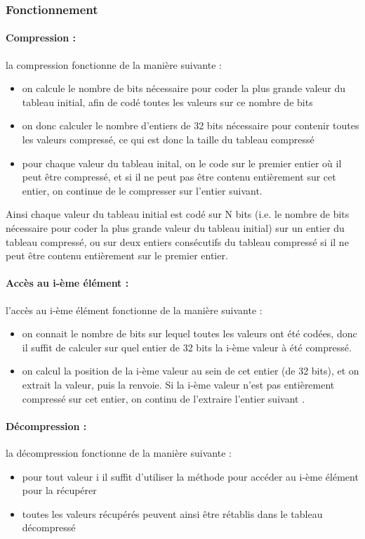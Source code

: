 \documentclass[titlepage]{article}
\begin{document}
\subsubsection{Fonctionnement}

\paragraph{Compression :} la compression fonctionne de la manière suivante :
\begin{itemize}
\item on calcule le nombre de bits nécessaire pour coder la plus grande valeur du tableau initial, afin de codé toutes les valeurs sur ce nombre de bits
\item on donc calculer le nombre d'entiers de 32 bits nécessaire pour contenir toutes les valeurs compressé, ce qui est donc la taille du tableau compressé
\item pour chaque valeur du tableau inital, on le code sur le premier entier où il peut être compressé, et si il ne peut pas être contenu entièrement sur cet entier, on continue de le compresser sur l'entier suivant.
\end{itemize}
\par Ainsi chaque valeur du tableau initial est codé sur N bits (i.e. le nombre de bits nécessaire pour coder la plus grande valeur du tableau initial) sur un entier du tableau compressé, ou sur deux entiers consécutifs du tableau compressé si il ne peut être contenu entièrement sur le premier entier.

\paragraph{Accès au i-ème élément :} l'accès au i-ème élément fonctionne de la manière suivante :
\begin{itemize}
\item on connait le nombre de bits sur lequel toutes les valeurs ont été codées, donc il suffit de calculer sur quel entier de 32 bits la i-ème valeur à été compressé. 
\item on calcul la position de la i-ème valeur au sein de cet entier (de 32 bits), et on extrait la valeur, puis la renvoie. Si la i-ème valeur n'est pas entièrement compressé sur cet entier, on continu de l'extraire l'entier suivant .
\end{itemize}


\paragraph{Décompression :} la décompression fonctionne de la manière suivante :
\begin{itemize}
\item pour tout valeur i il suffit d'utiliser la méthode pour accéder au i-ème élément pour la récupérer 
\item toutes les valeurs récupérés peuvent ainsi être rétablis dans le tableau décompressé
\end{itemize}
\end{document}
